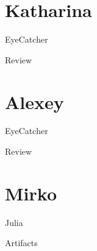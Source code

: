 \documentclass[aspectratio=169,10pt]{beamer}
\begin{document}
\section{Katharina}
\begin{frame}[fragile]{EyeCatcher}
\end{frame}
\begin{frame}[t,fragile]{Review}
\end{frame}

\section{Alexey}
\begin{frame}[fragile]{EyeCatcher}
\end{frame}
\begin{frame}[t,fragile]{Review}
\end{frame}

\section{Mirko}
\begin{frame}[fragile]{Julia}
  \vspace*{2em}
  \hspace*{.025\textwidth} %
  \begin{tikzpicture}
    
  \end{tikzpicture}
\end{frame}
\begin{frame}[t,fragile]{Artifacts }
  \vspace*{1.5em}
  \hspace*{-.075\textwidth} %
  \begin{tikzpicture}
    
  \end{tikzpicture}
\end{frame}
\end{document}
